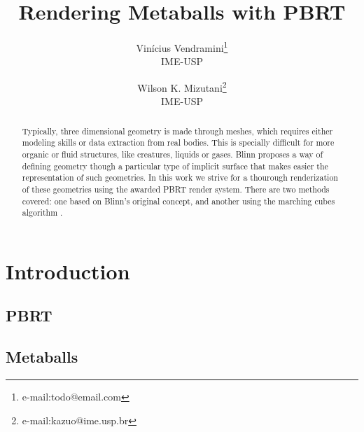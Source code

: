 \documentclass[conference]{acmsiggraph}
\title{Rendering Metaballs with PBRT}
\author{Vinícius Vendramini\thanks{e-mail:todo@email.com}\\IME-USP \and Wilson K. Mizutani\thanks{e-mail:kazuo@ime.usp.br}\\IME-USP}
\begin{document}

\maketitle

\begin{abstract}

Typically, three dimensional geometry is made through meshes, which requires
either modeling skills or data extraction from real bodies. This is specially
difficult for more organic or fluid structures, like creatures, liquids or
gases. Blinn  proposes a way of defining
geometry though a particular type of implicit surface that makes easier the
representation of such geometries. In this work we strive for a thourough
renderization of these geometries using the awarded PBRT
 render system. There are two methods covered:
one based on Blinn's original concept, and another using the marching cubes
algorithm \cite{Lorensen:1987:MCH:37402.37422}.

\end{abstract}


\keywordlist


\TOGlinkslist


\copyrightspace

\section{Introduction}

\subsection{PBRT}

\subsection{Metaballs}
\end{document}
